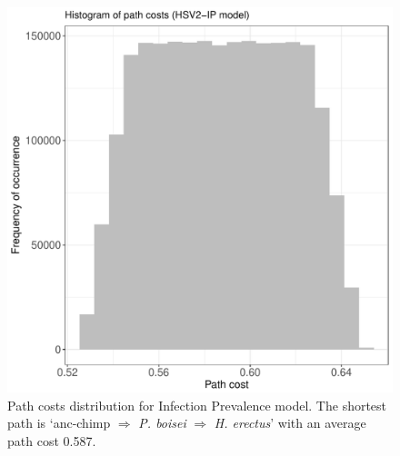 \documentclass[fleqn,10pt]{wlscirep}
\begin{document}
\begin{figure}
  \centering
  \includegraphics[width=\textwidth]{figs/beta_path_costs}
  \caption{Path costs distribution for Infection Prevalence model. The shortest path is ‘anc-chimp $\Rightarrow$ \textit{P. boisei} $\Rightarrow$ \textit{H. erectus}’ with an average path cost 0.587.}
  \label{fig:beta}   
\end{figure}     
\end{document}
